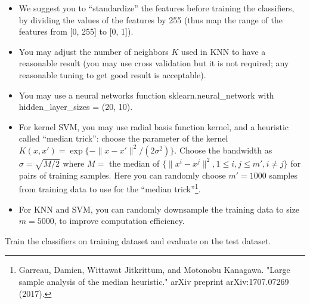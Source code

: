 \documentclass[twoside,10pt]{article}
\begin{document}
\begin{enumerate}
\begin{itemize}

\item We suggest you to ``standardize'' the features before training the classifiers, by dividing the values of the features by 255 (thus map the range of the features from [0, 255] to [0, 1]).

\item You may adjust the number of neighbors $K$ used in KNN to have a reasonable result (you may use cross validation but it is not required; any reasonable tuning to get good result is acceptable).

\item You may use a neural networks function \textsf{sklearn.neural\_network} with \textsf{hidden\_layer\_sizes = (20, 10)}. 


\item For kernel SVM, you may use  radial basis function kernel, and a heuristic called ``median trick'': choose the parameter of the kernel $K(x, x') = \exp\{-\|x-x'\|^2/(2\sigma^2)\}$. Choose the bandwidth as $\sigma=\sqrt{M/2}$ where $M =$ the median of $\{\|x^i-x^j\|^2, 1\leq i, j \leq m', i\neq j \}$ for pairs of training samples. Here you can randomly choose $m'=1000$ samples from training data to use for the ``median trick''\footnote{Garreau, Damien, Wittawat Jitkrittum, and Motonobu Kanagawa. "Large sample analysis of the median heuristic." arXiv preprint arXiv:1707.07269 (2017).}.

\item For KNN and SVM, you can randomly downsample the training data to size $m=5000$, to improve computation efficiency. 
\end{itemize}

Train the classifiers on training dataset and evaluate on the test dataset.

\begin{enumerate}


\end{enumerate}
\end{enumerate}
\end{document}
